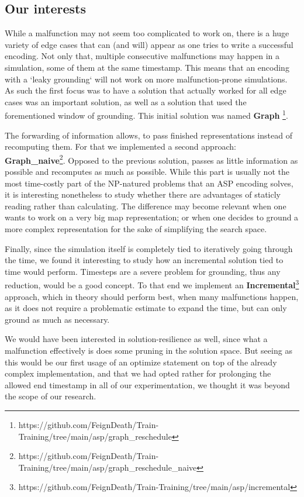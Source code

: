 \subsection{Our interests}
While a malfunction may not seem too complicated to work on, there is a huge variety of edge cases that can (and will) appear as one tries to write a successful encoding. Not only that, multiple consecutive malfunctions may happen in a simulation, some of them at the same timestamp. This means that an encoding with a `leaky grounding` will not work on more malfunction-prone simulations. As such the first focus was to have a solution that actually worked for all edge cases was an important solution, as well as a solution that used the forementioned window of grounding. This initial solution was named \textbf{Graph} \footnote{https://github.com/FeignDeath/Train-Training/tree/main/asp/graph\_reschedule}. 


The forwarding of information allows, to pass finished representations instead of recomputing them. For that we implemented a second approach: \textbf{Graph\_naive}\footnote{https://github.com/FeignDeath/Train-Training/tree/main/asp/graph\_reschedule\_naive}. Opposed to the previous solution, passes as little information as possible and recomputes as much as possible. While this part is usually not the most time-costly part of the NP-natured problems that an ASP encoding solves, it is interesting nonetheless to study whether there are advantages of staticly reading rather than calculating. The difference may become relevant when one wants to work on a very big map representation; or when one decides to ground a more complex representation for the sake of simplifying the search space.


Finally, since the simulation itself is completely tied to iteratively going through the time, we found it interesting to study how an incremental solution tied to time would perform. Timesteps are a severe problem for grounding, thus any reduction, would be a good concept. To that end we implement an \textbf{Incremental}\footnote{https://github.com/FeignDeath/Train-Training/tree/main/asp/incremental} approach, which in theory should perform best, when many malfunctions happen, as it does not require a problematic estimate to expand the time, but can only ground as much as necessary.


We would have been interested in solution-resilience as well, since what a malfunction effectively is does some pruning in the solution space. But seeing as this would be our first usage of an optimize statement on top of the already complex implementation, and that we had opted rather for prolonging the allowed end timestamp in all of our experimentation, we thought it was beyond the scope of our research.



